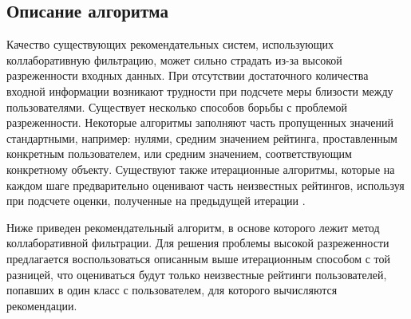 \documentclass[a4paper, 12pt]{article} %
\begin{document}
\subsection{Описание алгоритма}
Качество существующих рекомендательных систем, использующих коллаборативную фильтрацию, может сильно страдать из-за высокой разреженности входных данных. При отсутствии достаточного количества входной информации возникают трудности при подсчете меры близости между пользователями. Существует несколько способов борьбы с проблемой разреженности. Некоторые алгоритмы заполняют часть пропущенных значений стандартными, например: нулями, средним значением рейтинга, проставленным конкретным пользователем, или средним значением, соответствующим конкретному объекту. Существуют также итерационные алгоритмы, которые на каждом шаге предварительно оценивают часть неизвестных рейтингов, используя при подсчете оценки, полученные на предыдущей итерации\cite{itercf} . 
\par
Ниже приведен рекомендательный алгоритм, в основе которого лежит метод коллаборативной фильтрации. Для решения проблемы высокой разреженности предлагается воспользоваться описанным выше итерационным способом с той разницей, что оцениваться будут только неизвестные рейтинги пользователей, попавших в один класс с пользователем, для которого вычисляются рекомендации.  
\end{document}
